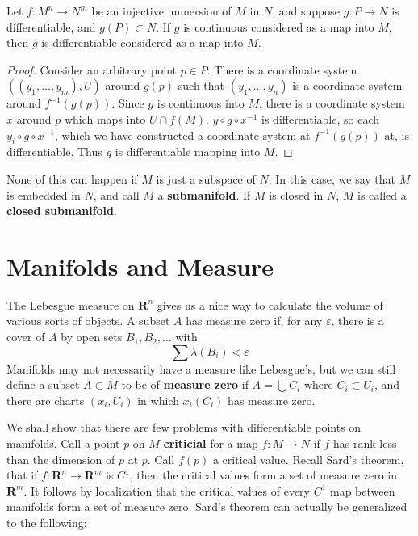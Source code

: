 \begin{theorem}
    Let $f:M^n \to N^m$ be an injective immersion of $M$ in $N$, and suppose $g: P \to N$ is differentiable, and $g(P) \subset N$. If $g$ is continuous considered as a map into $M$, then $g$ is differentiable considered as a map into $M$.
\end{theorem}
\begin{proof}
    Consider an arbitrary point $p \in P$. There is a coordinate system $((y_1, \dots, y_m),U)$ around $g(p)$ such that $(y_1, \dots, y_n)$ is a coordinate system around $f^{-1}(g(p))$. Since $g$ is continuous into $M$, there is a coordinate system $x$ around $p$ which maps into $U \cap f(M)$. $y \circ g \circ x^{-1}$ is differentiable, so each $y_i \circ g \circ x^{-1}$, which we have constructed a coordinate system at $f^{-1}(g(p))$ at, is differentiable. Thus $g$ is differentiable mapping into $M$.
\end{proof}

None of this can happen if $M$ is just a subspace of $N$. In this case, we say that $M$ is embedded in $N$, and call $M$ a {\bf submanifold}. If $M$ is closed in $N$, $M$ is called a {\bf closed submanifold}.



\section{Manifolds and Measure}

The Lebesgue measure on $\mathbf{R}^n$ gives us a nice way to calculate the volume of various sorts of objects. A subset $A$ has measure zero if, for any $\varepsilon$, there is a cover of $A$ by open sets $B_1, B_2, \dots$ with
%
\[ \sum \lambda(B_i) < \varepsilon \]
%
Manifolds may not necessarily have a measure like Lebesgue's, but we can still define a subset $A \subset M$ to be of {\bf measure zero} if $A = \bigcup C_i$ where $C_i \subset U_i$, and there are charts $(x_i,U_i)$ in which $x_i(C_i)$ has measure zero.

We shall show that there are few problems with differentiable points on manifolds. Call a point $p$ on $M$ {\bf criticial} for a map $f:M \to N$ if $f$ has rank less than the dimension of $p$ at $p$. Call $f(p)$ a critical value. Recall Sard's theorem, that if $f: \mathbf{R}^n \to \mathbf{R}^m$ is $C^1$, then the critical values form a set of measure zero in $\mathbf{R}^m$. It follows by localization that the critical values of every $C^1$ map between manifolds form a set of measure zero. Sard's theorem can actually be generalized to the following:

